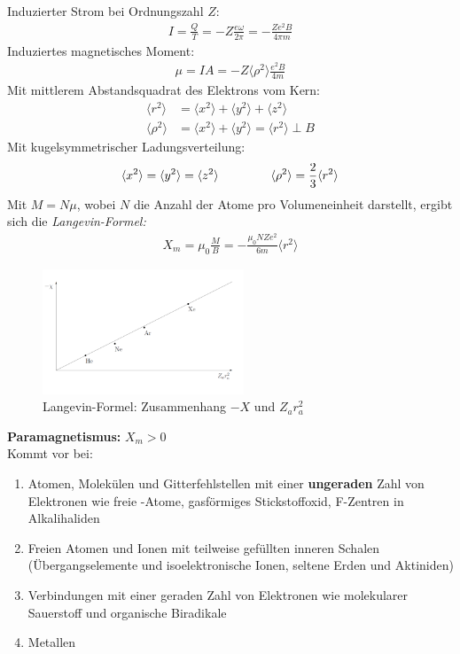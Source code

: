 Induzierter Strom bei Ordnungszahl $Z$:
\begin{align}
    I = \frac{Q}{T} = - Z \frac{e \omega}{2 \pi} = - \frac{Z e^2 B}{ 4 \pi m}
\end{align}
Induziertes magnetisches Moment:
\begin{align}
    \mu = I A = -Z \langle \rho ^2 \rangle \frac{e^2 B}{4 m}
\end{align}
Mit mittlerem Abstandsquadrat des Elektrons vom Kern:
\begin{align}
    \langle r^2 \rangle &= \langle x^2 \rangle + \langle y^2 \rangle + \langle z^2 \rangle \\
    \langle \rho^2 \rangle  &= \langle x^2 \rangle + \langle y^2 \rangle = \langle r^2 \rangle \perp B
\end{align}
Mit kugelsymmetrischer Ladungsverteilung:
\begin{align}
    \langle x^2 \rangle = \langle y^2 \rangle = \langle z^2 \rangle \hspace{1.5 cm} \langle \rho^2 \rangle = \frac{2}{3} \langle r^2 \rangle
\end{align}
Mit $M = N \mu$, wobei $N$ die Anzahl der Atome pro Volumeneinheit darstellt, ergibt sich die \textit{Langevin-Formel:}
\begin{align}
    X _m = \mu_0 \frac{M}{B} = - \frac{\mu _0 N Z e^2}{6 m} \langle r^2 \rangle
\end{align}

\begin{figure}[H]
    \centering
    \includegraphics[width=6cm]{resources/05-05-2015/Frage32_Langevin.PNG}
    \caption{Langevin-Formel: Zusammenhang $-X$ und $Z_a r_a^2$}
\end{figure} \bigskip

\textbf{Paramagnetismus:} $X _m > 0$ \\
Kommt vor bei:
\begin{enumerate}
    \item Atomen, Molekülen und Gitterfehlstellen mit einer \textbf{ungeraden} Zahl von Elektronen wie freie -Atome, gasförmiges Stickstoffoxid, F-Zentren in Alkalihaliden
    \item Freien Atomen und Ionen mit teilweise gefüllten inneren Schalen (Übergangselemente und isoelektronische Ionen, seltene Erden und Aktiniden)
    \item Verbindungen mit einer geraden Zahl von Elektronen wie molekularer Sauerstoff und organische Biradikale
    \item Metallen
\end{enumerate}

